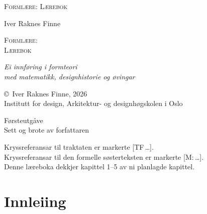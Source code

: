 \documentclass[10pt]{book}
\renewcommand{\footnotesize}{\fontsize{8pt}{10pt}\selectfont}
\renewcommand{\small}{\fontsize{9pt}{11pt}\selectfont}
\renewcommand{\normalsize}{\fontsize{10.5pt}{13pt}\selectfont}
\theoremstyle{definition}
\theoremstyle{plain}
\theoremstyle{remark}
\newcommand{\TF}[1]{\textnormal{[TF\,#1]}}
\newcommand{\Mref}[1]{\textnormal{[M:\,#1]}}
\begin{document}
\thispagestyle{empty}
\vspace*{5cm}
\begin{center}
{\fontsize{14pt}{17pt}\selectfont\scshape Forml\ae re: L\ae rebok}
\end{center}
\newpage

\thispagestyle{empty}
\vspace*{3cm}
\begin{center}
{\normalsize Iver Raknes Finne}

\vspace{1.5cm}
{\fontsize{22pt}{26pt}\selectfont\scshape Forml\ae re:\\[6pt]
L\ae rebok}

\vspace{0.6cm}
{\normalsize\itshape Ei innf\o ring i formteori\\[3pt]
med matematikk, designhistorie og \o vingar}
\end{center}
\vfill
\begin{center}
{\small 2026}
\end{center}
\newpage

\thispagestyle{empty}
\vspace*{\fill}
{\footnotesize
\copyright\ Iver Raknes Finne, 2026\\
Institutt for design, Arkitektur- og designh\o gskolen i Oslo

\medskip
F\o rsteutg\aa ve\\
Sett og brote av forfattaren

\medskip
Kryssreferansar til traktaten er markerte \TF{\ldots}.\\
Kryssreferansar til den formelle s\o sterteksten er markerte \Mref{\ldots}.\\[6pt]
Denne l\ae reboka dekkjer kapittel 1--5 av ni planlagde kapittel.}
\newpage

\tableofcontents
\newpage


\chapter*{Innleiing}
\end{document}
